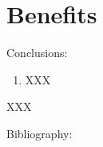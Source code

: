 \section{Benefits}

 \begin{frame}[c]{Conclusions:}
 
     \begin{enumerate}
    \item XXX

\end{enumerate}

XXX
 \end{frame}
 
 
 
 
\begin{frame}[allowframebreaks]{Bibliography:}
 



\end{frame}
